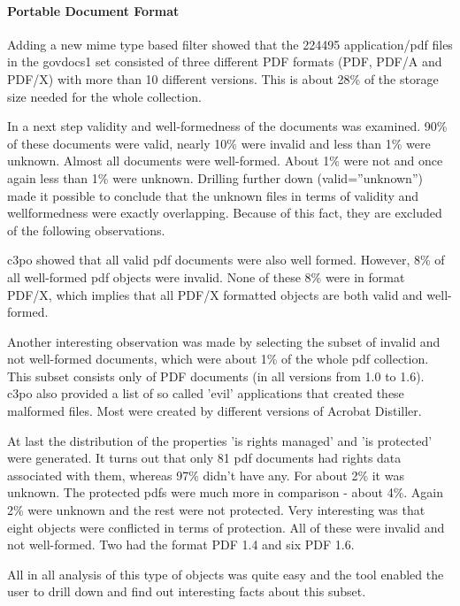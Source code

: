 \paragraph{Portable Document Format}
Adding a new mime type based filter showed that the 224495 application/pdf files in the govdocs1 set consisted of three different PDF formats (PDF, PDF/A and PDF/X) with more than 10 different versions. This is about 28\% of the storage size  needed for the whole collection.

In a next step validity and well-formedness of the documents was examined. 90\% of these documents were valid, nearly 10\% were invalid and less than 1\% were unknown. Almost all documents were well-formed. About 1\% were not and once again less than 1\% were unknown. Drilling further down (valid=''unknown'') made it possible to conclude that  the unknown files in terms of validity and wellformedness were exactly overlapping. Because of this fact, they are excluded of the following observations.

c3po showed that all valid pdf documents were also well formed. However, 8\% of all well-formed pdf objects were invalid. None of these 8\% were in format PDF/X, which implies that all PDF/X formatted objects are both valid and well-formed.

Another interesting observation was made by selecting the subset of invalid and not well-formed documents, which were about 1\% of the whole pdf collection. This subset consists only of PDF documents (in all versions from 1.0 to 1.6). c3po also provided a list of so called 'evil' applications that created these malformed files. Most were created by different versions of Acrobat Distiller.

At last the distribution of the properties 'is rights managed' and 'is protected' were generated.
It turns out that only 81 pdf documents had rights data associated with them, whereas 97\% didn't have any. For about 2\% it was unknown. The protected pdfs were much more in comparison - about 4\%. Again 2\% were unknown and the rest were not protected. Very interesting was that eight objects were conflicted in terms of protection. All of these were invalid and not well-formed. Two had the format PDF 1.4 and six PDF 1.6.

All in all analysis of this type of objects was quite easy and the tool enabled the user to drill down and find out interesting facts about this subset.

